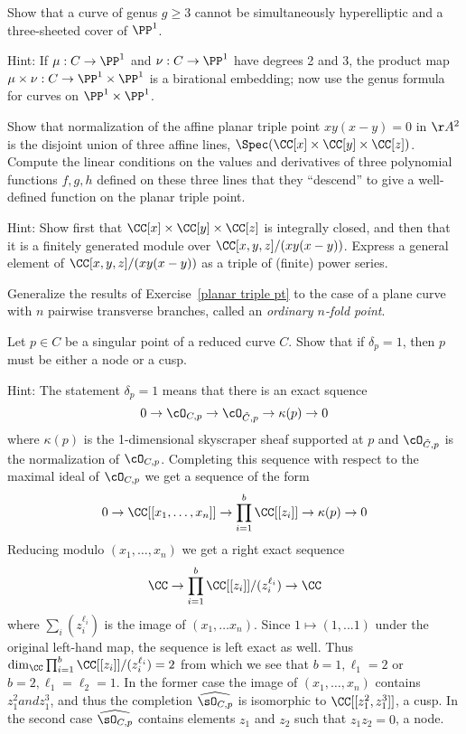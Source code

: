 \begin{exercise}\label{gonality exclusion}
Show that a curve of genus $g \geq 3$ cannot be simultaneously hyperelliptic and a three-sheeted cover of $\PP^1$.

Hint: If $\mu : C \to \PP^1$ and $\nu : C \to \PP^1$ have degrees 2 and 3, the product map $\mu \times \nu : C \to \PP^1 \times \PP^1$ is a birational embedding; now use the genus formula for curves on $\PP^1 \times \PP^1$.
\end{exercise}

\begin{exercise}\label{planar triple pt}
Show that normalization of the affine planar triple point $xy(x-y) = 0$ in $\AA^2$ is the disjoint union of three
affine lines, $\Spec(\CC[x] \times \CC[y]\times \CC[z])$. Compute the linear conditions on the values and derivatives of three polynomial functions $f,g,h$ defined on
these three lines that they ``descend'' to give a well-defined function on the planar triple point.

Hint: Show first that $\CC[x] \times \CC[y]\times \CC[z]$ is integrally closed, and then that it is a finitely generated module over $\CC[x,y,z]/(xy(x-y))$.
Express a general element of $\CC[x,y,z]/(xy(x-y))$ as a triple of (finite) power series.
\end{exercise}

\begin{exercise} Generalize the results of Exercise~\ref{planar triple pt} to the case of a plane curve with $n$ pairwise
transverse branches, called an \emph{ordinary $n$-fold point}.
\end{exercise}

\begin{exercise}\label{delta=1 characterization}
Let $p \in C$ be a singular point of a reduced curve $C$. Show that if $\delta_p = 1$, then $p$ must be either a node or a cusp.

Hint: The statement $\delta_p = 1$ means that there is an exact squence
$$
0 \to \cO_{C,p} \to\cO_{\tilde C,p} \to \kappa(p) \to 0
$$
where $\kappa(p)$ is the 1-dimensional skyscraper sheaf supported at $p$ and $\cO_{\tilde C,p}$ is
the normalization of $\cO_{C,p}$. Completing this sequence with respect to the maximal ideal
of $\cO_{C,p}$ we get a sequence of the form
$$
0 \to \CC[[x_1,\dots,x_n]] \to \prod_{i=1}^b \CC[[z_i]] \to \kappa(p) \to 0
$$
Reducing modulo $(x_1,\dots,x_n)$ we get a right exact sequence
$$
\CC \to \prod_{i=1}^b \CC[[z_i]]/(z_i^{\ell_i}) \to \CC
$$
where $\sum_i (z_i^{\ell_i})$ is the image of $(x_1,\dots x_n)$.
Since $1\mapsto (1,...1)$ under the original left-hand map, the sequence is 
left exact as well. Thus
$\dim_\CC \prod_{i=1}^b \CC[[z_i]]/(z_i^{\ell_i})=2$
from which we see that $b=1, \ell_1 = 2$ or $b = 2, \ell_1=\ell_2 = 1$.
In the former case the image of $(x_1,\dots,x_n)$ contains $ z_1^2 and z_1^3$,
and thus the completion $\widehat{\sO_{C,p}}$ is isomorphic to $\CC[[z_1^2, z_1^3]]$,
a cusp. In the second case $\widehat{\sO_{C,p}}$ contains elements $z_1$ and $z_2$
such that $z_1z_2 = 0$, a node.
\end{exercise}




